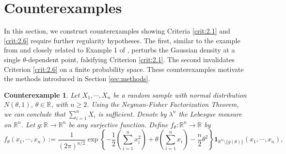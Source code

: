 \documentclass[12pt]{article}
\newtheorem{counterexample}{Counterexample}[section]
\begin{document}
\section{Counterexamples}
\label{sec:counterexamples}

In this section, we construct counterexamples showing Criteria \ref{crit:2.1} and \ref{crit:2.6} require further regularity hypotheses. The first, similar to the example from \citet{Barndorff1976} and closely related to Example 1 of \cite{Taraldsen2026}, perturbs the Gaussian density at a single $\theta$-dependent point, falsifying Criterion \ref{crit:2.1}. The second invalidates Criterion \ref{crit:2.6} on a finite probability space.
These counterexamples motivate the methods introduced in Section \ref{sec:methods}.

\begin{counterexample}
\label{ex:3.1}
Let $X_1,\cdots, X_n$ be a random sample with normal distribution $N(\theta, 1)$, $\theta\in\mathbb{R}$, with $n\geq 2$. Using the Neyman-Fisher Factorization Theorem, we can conclude that $\sum _{i=1}^nX_i$ is sufficient. Denote by $\lambda ^n$ the Lebesgue measure on $\mathbb{R}^n$. Let $g:\mathbb{R}\to \mathbb{R}^n$ be any surjective function. Define $f_\theta :\mathbb{R}^n\to \mathbb{R}$ by
$$f_\theta (x_1,\cdots, x_n):=\frac{1}{(2\pi )^{n/2}}\exp \left\{-\frac{1}{2}\left(\sum_{i=1}^nx_i^2\right)+\theta \left(\sum_{i=1}^nx_i\right)-\frac{n}{2}\theta ^2\right\}\mathbf{1}_{\mathbb{R}^n\setminus \{g(\theta )\}}(x_1,\cdots, x_n),$$

\end{counterexample}
\end{document}
